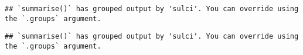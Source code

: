 \documentclass[
]{article}
\newenvironment{Shaded}{\begin{snugshade}}{\end{snugshade}}
\newcommand{\DataTypeTok}[1]{\textcolor[rgb]{0.13,0.29,0.53}{#1}}
\newcommand{\KeywordTok}[1]{\textcolor[rgb]{0.13,0.29,0.53}{\textbf{#1}}}
\newcommand{\NormalTok}[1]{#1}
\newcommand{\OperatorTok}[1]{\textcolor[rgb]{0.81,0.36,0.00}{\textbf{#1}}}
\newcommand{\StringTok}[1]{\textcolor[rgb]{0.31,0.60,0.02}{#1}}
\begin{document}
\begin{verbatim}
## `summarise()` has grouped output by 'sulci'. You can override using the `.groups` argument.
\end{verbatim}

\begin{Shaded}
\end{Shaded}

\begin{verbatim}
## `summarise()` has grouped output by 'sulci'. You can override using the `.groups` argument.
\end{verbatim}
\end{document}
